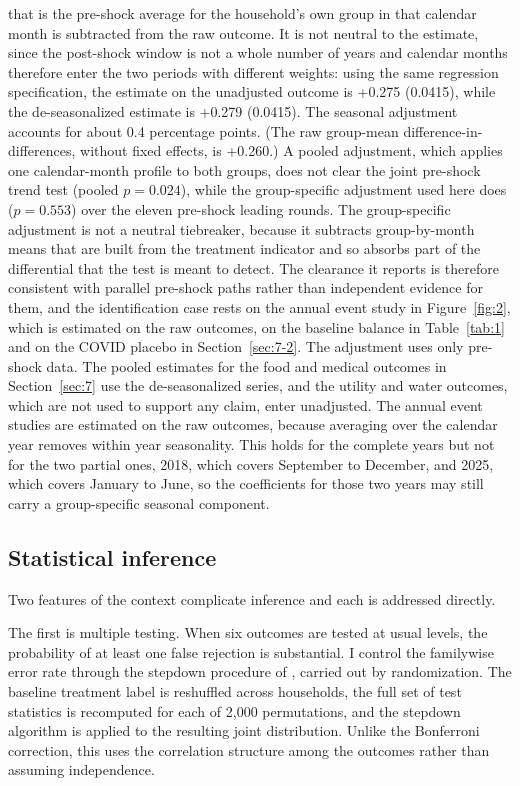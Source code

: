 that is the pre-shock average for the household's own group in that calendar month is subtracted from the raw outcome. It is not neutral to the estimate, since the post-shock window is not a whole number of years and calendar months therefore enter the two periods with different weights: using the same regression specification, the estimate on the unadjusted
outcome is +0.275 (0.0415), while the de-seasonalized estimate is +0.279
(0.0415). The seasonal adjustment accounts for about 0.4 percentage points. (The raw group-mean difference-in-differences, without fixed effects, is +0.260.) A pooled adjustment, which applies one calendar-month profile to both groups,
does not clear the joint pre-shock trend test (pooled $p = 0.024$), while the
group-specific adjustment used here does ($p = 0.553$) over the eleven pre-shock
leading rounds. The group-specific adjustment is not a neutral tiebreaker,
because it subtracts group-by-month means that are built from the treatment
indicator and so absorbs part of the differential that the test is meant to
detect. The clearance it reports is therefore consistent with parallel pre-shock
paths rather than independent evidence for them, and the identification case
rests on the annual event study in Figure~\ref{fig:2}, which is
estimated on the raw outcomes, on the baseline balance in
Table~\ref{tab:1} and on the COVID placebo in
Section~\ref{sec:7-2}. The adjustment uses only pre-shock data. The pooled estimates for the food and medical outcomes in Section~\ref{sec:7} use the de-seasonalized series, and the utility and water outcomes, which are not used to support any claim, enter unadjusted. The annual event studies are estimated on the raw outcomes, because averaging over the calendar year removes within year seasonality. This holds for the complete years but not for the two partial ones, 2018, which covers September to December, and 2025, which covers January to June, so the coefficients for those two years may still carry a group-specific seasonal component.

\subsection{Statistical inference}\label{sec:6-7}

Two features of the context complicate inference and each is addressed directly.

The first is multiple testing. When six outcomes are tested at usual levels, the probability of at least one false rejection is substantial. I control the familywise error rate through the stepdown procedure of \cite{romano2005}, carried out by randomization. The baseline treatment label is reshuffled across households, the full set of test statistics is recomputed for each of 2,000 permutations, and the stepdown algorithm is applied to the resulting joint distribution. Unlike the Bonferroni correction, this uses the correlation structure among the outcomes rather than assuming independence.


